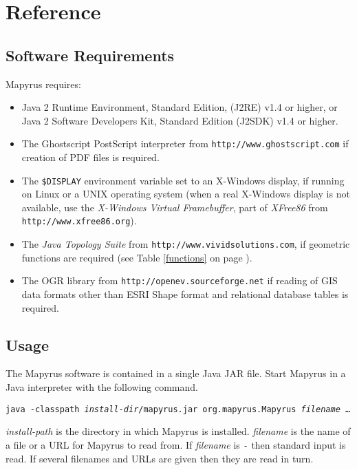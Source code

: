 
\section{Reference}

\subsection{Software Requirements}

Mapyrus requires:
\begin{itemize}
\item
Java 2 Runtime Environment, Standard Edition, (J2RE) v1.4 or higher,
or Java 2 Software Developers Kit, Standard Edition (J2SDK) v1.4 or higher.
\item
The Ghostscript PostScript interpreter from 
\texttt{http://www.ghostscript.com}
if creation of PDF files is required.
\item
The \texttt{\$DISPLAY} environment variable set to an X-Windows display,
if running on Linux or a UNIX operating system (when a real X-Windows display
is not available, use the
\textit{X-Windows Virtual Framebuffer}, part of \textit{XFree86}
from
\texttt{http://www.xfree86.org}).
\item
The \textit{Java Topology Suite} from \texttt{http://www.vividsolutions.com},
if geometric functions are required
(see Table \ref{functions} on page \pageref{functions}).
\item
The OGR library from
\texttt{http://openev.sourceforge.net}
if reading of GIS data formats other than ESRI Shape format
and relational database tables is required.
\end{itemize}

\subsection{Usage}

The Mapyrus software is contained in a single Java JAR file.
Start Mapyrus in a Java interpreter with the following command.

\vspace{10pt}
\texttt{java -classpath \textit{install-dir}/mapyrus.jar org.mapyrus.Mapyrus \textit{filename} \dots}
\vspace{10pt}

\textit{install-path} is the directory in which
Mapyrus is installed.  \textit{filename} is the name of a file
or a URL for Mapyrus to read from.  If \textit{filename} is \texttt{-}
then standard input is read.  If several filenames and URLs are
given then they are read in turn.


